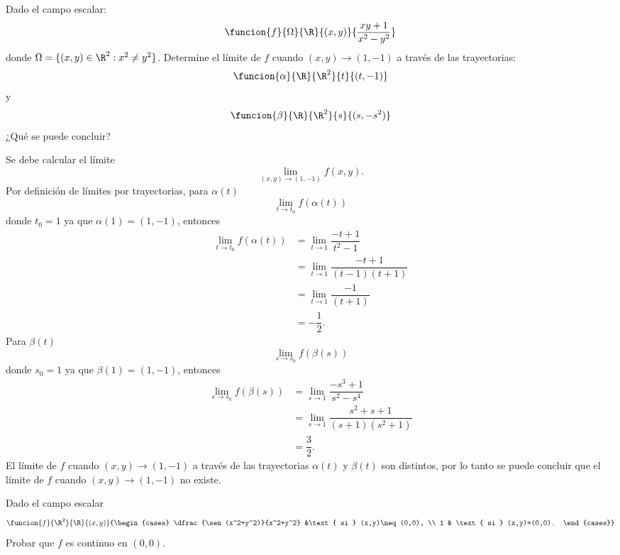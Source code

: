 \documentclass[a4,11pt]{aleph-examen}
\begin{document}
\begin{preguntas}
\begin{respuesta}
\item
    Dado el campo escalar:
    \[
        \funcion{f}{\Omega}{\R}{(x,y)}{\dfrac{xy+1}{x^2-y^2}}
    \]
    donde $\Omega=\lbrace (x,y)\in\R^2:x^2\neq y^2 \rbrace$.
    Determine el límite de $f$ cuando $(x,y) \to (1,-1)$ a través de las trayectorias:
    \[
        \funcion{\alpha}{\R}{\R^2}{t}{(t,-1)}
    \]
    y 
    \[
        \funcion{\beta}{\R}{\R^2}{s}{(s,-s^2)}
    \]
    ¿Qué se puede concluir?
\begin{respuesta}
    Se debe calcular el límite
    \[
        \lim_{(x,y)\to (1,-1)} f(x,y).
    \]
    Por definición de límites por trayectorias, para $\alpha(t)$
    \[
        \lim_{t\to t_0} f(\alpha(t))
    \]
    donde $t_0=1$ ya que $\alpha(1)=(1,-1)$, entonces
    \[
    \begin{aligned}
        \lim_{t\to t_0} f(\alpha(t))&=\lim_{t\to 1} \dfrac{-t+1}{t^2-1}\\
        &=\lim_{t\to 1} \dfrac{-t+1}{(t-1)(t+1)}\\
        &=\lim_{t\to 1} \dfrac{-1}{(t+1)}\\
        &=-\dfrac{1}{2}.
    \end{aligned}
    \]
    Para $\beta(t)$
    \[
        \lim_{s\to s_0} f(\beta(s))
    \]
    donde $s_0=1$ ya que $\beta(1)=(1,-1)$, entonces 
    \[
    \begin{aligned}
        \lim_{s\to s_0} f(\beta(s))&=\lim_{s\to 1} \dfrac{-s^3+1}{s^2-s^4}\\
        &=\lim_{s\to 1} \dfrac{s^2+s+1}{(s+1)(s^2+1)}\\
        &=\dfrac{3}{2}.
    \end{aligned}
    \]
El límite de $f$ cuando $(x,y) \rightarrow (1,-1)$ a través de las trayectorias $\alpha(t)$ y $\beta(t)$ son distintos, por lo tanto se puede concluir que el límite de $f$ cuando $(x,y) \to (1,-1)$ no existe.
\end{respuesta}

\item
	Dado el campo escalar
    \[
    	\funcion{f}{\R^2}{\R}{(x,y)}%
            	{\begin{cases}
            		\dfrac{\sen(x^2+y^2)}{x^2+y^2} &\text{ si }   (x,y)\neq(0,0), \\
             		1 &  \text{ si }  (x,y)=(0,0).
                 \end{cases}}
    \]
	Probar que $f$ es continuo en $(0,0)$.


\end{respuesta}
\end{preguntas}
\end{document}
